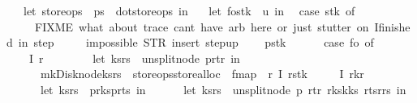 \begin{isabellebody}
\ \ {\isacharparenleft}{\isacharasterisk}\ let\ store{\isacharunderscore}ops\ {\isacharequal}\ ps{}\ {\isacharbar}{\isachargreater}\ dot{\isacharunderscore}store{\isacharunderscore}ops\ in\ {\isacharasterisk}{\isacharparenright}\isanewline
\ \ let\ {\isacharparenleft}fo{\isacharcomma}stk{\isacharparenright}\ {\isacharequal}\ u\ in\isanewline
\ \ case\ stk\ of\ \isanewline
\ \ {\isacharbrackleft}{\isacharbrackright}\ {\isasymRightarrow}\ \isanewline
\ \ \ \ {\isacharparenleft}{\isacharasterisk}\ FIXME\ what\ about\ trace{\isacharquery}\ can{\isacharprime}t\ have\ arb\ here{\isacharsemicolon}\ or\ just\ stutter\ on\ I{\isacharunderscore}finished\ in\ step{\isacharquery}\ {\isacharasterisk}{\isacharparenright}\isanewline
\ \ \ \ impossible{}\ {\isacharparenleft}STR\ {\isacharprime}{\isacharprime}insert{\isacharcomma}\ step{\isacharunderscore}up{\isacharprime}{\isacharprime}{\isacharparenright}\ \isanewline
\ \ {\isacharbar}\ p{\isacharhash}stk{\isacharprime}\ {\isasymRightarrow}\ {\isacharparenleft}\isanewline
\ \ \ \ case\ fo\ of\isanewline
\ \ \ \ I{}\ r\ {\isasymRightarrow}\ {\isacharparenleft}\isanewline
\ \ \ \ \ \ let\ {\isacharparenleft}ks{\isacharcomma}rs{\isacharparenright}\ {\isacharequal}\ unsplit{\isacharunderscore}node\ {\isacharparenleft}p{\isasymlparr}r{\isacharunderscore}t{\isacharcolon}{\isacharequal}r{\isasymrparr}{\isacharparenright}\ in\isanewline
\ \ \ \ \ \ mk{\isacharunderscore}Disk{\isacharunderscore}node{\isacharparenleft}ks{\isacharcomma}rs{\isacharparenright}\ {\isacharbar}{\isachargreater}\ {\isacharparenleft}store{\isacharunderscore}ops{\isacharbar}{\isachargreater}store{\isacharunderscore}alloc{\isacharparenright}\ {\isacharbar}{\isachargreater}\ fmap\ {\isacharparenleft}{\isacharpercent}\ r{\isachardot}\ {\isacharparenleft}I{}\ r{\isacharcomma}stk{\isacharprime}{\isacharparenright}{\isacharparenright}{\isacharparenright}\isanewline
\ \ \ \ {\isacharbar}\ I{}\ {\isacharparenleft}r{}{\isacharcomma}k{\isacharcomma}r{}{\isacharparenright}\ {\isasymRightarrow}\ {\isacharparenleft}\isanewline
\ \ \ \ \ \ let\ {\isacharparenleft}ks{}{\isacharcomma}rs{}{\isacharparenright}\ {\isacharequal}\ {\isacharparenleft}p{\isacharbar}{\isachargreater}r{\isacharunderscore}ks{}{\isacharcomma}p{\isacharbar}{\isachargreater}r{\isacharunderscore}ts{}{\isacharparenright}\ in\isanewline
\ \ \ \ \ \ let\ {\isacharparenleft}ks{\isacharprime}{\isacharcomma}rs{\isacharprime}{\isacharparenright}\ {\isacharequal}\ unsplit{\isacharunderscore}node\ {\isacharparenleft}p{\isasymlparr}\ r{\isacharunderscore}t{\isacharcolon}{\isacharequal}r{}{\isacharcomma}\ r{\isacharunderscore}ks{}{\isacharcolon}{\isacharequal}k{\isacharhash}ks{}{\isacharcomma}\ r{\isacharunderscore}ts{}{\isacharcolon}{\isacharequal}r{}{\isacharhash}rs{}{\isasymrparr}{\isacharparenright}\ in\isanewline

\end{isabellebody}
